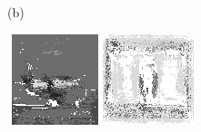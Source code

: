 \documentclass{article}
\begin{document}
\begin{figure}[t]
\begin{minipage}[c]{.21\linewidth}
  \end{minipage}
  \begin{minipage}[c]{.1\linewidth}
    \centering\centerline{(b)}
  \end{minipage}
  \begin{minipage}[c]{.21\linewidth}
    \centering\centerline{\includegraphics[width=\linewidth]{imgs/gens_cal/airplane/sums/13_0.png}}
  \end{minipage}
  \begin{minipage}[c]{.21\linewidth}
    \centering\centerline{\includegraphics[width=\linewidth]{imgs/gens_cal/dollar/sums/0_0.png}}

\end{minipage}
\end{figure}
\end{document}

